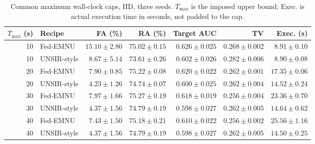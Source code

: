 \documentclass[software,article,submit,moreauthors]{Definitions/mdpi}
\begin{document}
\begin{table}[htbp]\centering\footnotesize\setlength{\tabcolsep}{4pt}
\caption{Common maximum wall-clock caps, IID, three seeds. $T_{\max}$ is the imposed upper bound; Exec. is actual execution time in seconds, not padded to the cap.}\label{tab:walltime-iid}
\begin{tabular}{rlrrrrr}\toprule $T_{\max}$ (s) & Recipe & FA (\%) & RA (\%) & Target AUC & TV & Exec. (s)\\\midrule
10 & Fed-EMNU & $15.10 \pm 2.80$ & $75.02 \pm 0.15$ & $0.626 \pm 0.025$ & $0.268 \pm 0.002$ & $8.91 \pm 0.10$\\
10 & UNSIR-style & $8.67 \pm 5.14$ & $73.61 \pm 0.26$ & $0.602 \pm 0.026$ & $0.282 \pm 0.006$ & $8.90 \pm 0.08$\\
20 & Fed-EMNU & $7.90 \pm 0.85$ & $75.22 \pm 0.08$ & $0.620 \pm 0.022$ & $0.262 \pm 0.001$ & $17.35 \pm 0.06$\\
20 & UNSIR-style & $4.23 \pm 1.26$ & $74.74 \pm 0.07$ & $0.600 \pm 0.025$ & $0.262 \pm 0.004$ & $14.52 \pm 0.24$\\
30 & Fed-EMNU & $7.97 \pm 1.66$ & $75.27 \pm 0.19$ & $0.618 \pm 0.019$ & $0.256 \pm 0.004$ & $23.36 \pm 0.70$\\
30 & UNSIR-style & $4.37 \pm 1.56$ & $74.79 \pm 0.19$ & $0.598 \pm 0.027$ & $0.262 \pm 0.005$ & $14.64 \pm 0.62$\\
40 & Fed-EMNU & $7.43 \pm 1.50$ & $75.18 \pm 0.21$ & $0.610 \pm 0.022$ & $0.256 \pm 0.002$ & $25.56 \pm 1.16$\\
40 & UNSIR-style & $4.37 \pm 1.56$ & $74.79 \pm 0.19$ & $0.598 \pm 0.027$ & $0.262 \pm 0.005$ & $14.50 \pm 0.25$\\
\bottomrule\end{tabular}\end{table}
\end{document}
